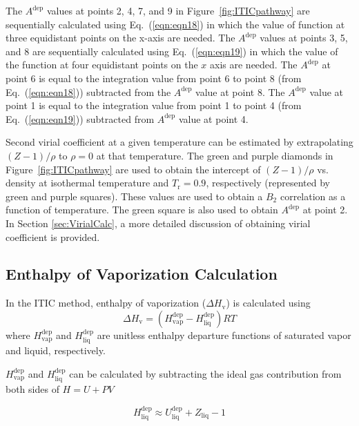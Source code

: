 \documentclass[5p,times]{elsarticle}
\begin{document}
The $A^{\mathrm{dep}}$ values at points 2, 4, 7, and 9 in Figure~\ref{fig:ITICpathway} are sequentially calculated using Eq.~(\ref{eqn:eqn18}) in which the value of function at three equidistant points on the x-axis are needed. The $A^{\mathrm{dep}}$ values at points 3, 5, and 8 are sequentially calculated using Eq.~(\ref{eqn:eqn19}) in which the value of the function at four equidistant points on the $x$ axis are needed. The $A^{\mathrm{dep}}$ at point 6 is equal to the integration value from point 6 to point 8 (from Eq.~(\ref{eqn:eqn18})) subtracted from the $A^{\mathrm{dep}}$ value at point 8. The $A^{\mathrm{dep}}$ value at point 1 is equal to the integration value from point 1 to point 4 (from Eq.~(\ref{eqn:eqn19})) subtracted from $A^{\mathrm{dep}}$ value at point 4. 

Second virial coefficient at a given temperature can be estimated by extrapolating $(Z-1)/\rho$ to $\rho=0$ at that temperature. The green and purple diamonds in Figure~\ref{fig:ITICpathway} are used to obtain the intercept of $(Z-1)/\rho$ vs. density at isothermal temperature and $T_{\mathrm{r}}=0.9$, respectively (represented by green and purple squares). These values are used to obtain a $B_2$ correlation as a function of temperature. The green square is also used to obtain $A^\mathrm{dep}$ at point 2. In Section \ref{sec:VirialCalc}, a more detailed discussion of obtaining virial coefficient is provided.

\subsection{Enthalpy of Vaporization Calculation}\label{sec:HvapCalc}
In the ITIC method, enthalpy of vaporization ($\Delta H_\mathrm{v}$) is calculated using
\begin{equation}
\Delta H_\mathrm{v}= ( H^{\mathrm{dep}}_\mathrm{vap} - H^{\mathrm{dep}}_\mathrm{liq})RT
\label{eqn:Hvap}
\end{equation}
where $H^{\mathrm{dep}}_\mathrm{vap}$ and $H^{\mathrm{dep}}_\mathrm{liq}$ are unitless enthalpy departure functions of saturated vapor and liquid, respectively.

$H^{\mathrm{dep}}_\mathrm{vap}$ and $H^{\mathrm{dep}}_\mathrm{liq}$  can be calculated by subtracting the ideal gas contribution from both sides of $H=U+PV$

\begin{equation}
H^{\mathrm{dep}}_\mathrm{liq} \approx U^{\mathrm{dep}}_\mathrm{liq}+Z_\mathrm{liq} - 1
\label{eqn:HsatLiq}
\end{equation}
\end{document}
